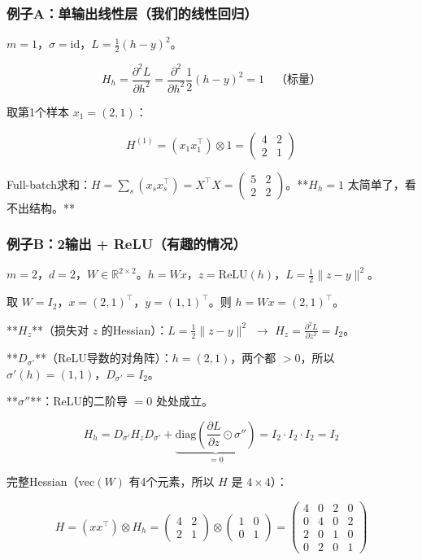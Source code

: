 \documentclass[12pt,a4paper]{article}
\begin{document}
\subsubsection{例子A：单输出线性层（我们的线性回归）}

$m = 1$，$\sigma = \text{id}$，$L = \frac{1}{2}(h - y)^2$。


\[H_h = \frac{\partial^2 L}{\partial h^2} = \frac{\partial^2}{\partial h^2}\frac{1}{2}(h-y)^2 = 1 \quad \text{（标量）}\]

取第1个样本 $x_1 = (2, 1)$：


\[H^{(1)} = (x_1 x_1^\top) \otimes 1 = \begin{pmatrix}4&2\\2&1\end{pmatrix}\]

Full-batch求和：$H = \sum_s (x_s x_s^\top) = X^\top X = \begin{pmatrix}5&2\\2&2\end{pmatrix}$。**$H_h = 1$ 太简单了，看不出结构。**


\subsubsection{例子B：2输出 + ReLU（有趣的情况）}

$m = 2$，$d = 2$，$W \in \mathbb{R}^{2 \times 2}$。$h = Wx$，$z = \text{ReLU}(h)$，$L = \frac{1}{2}\|z - y\|^2$。

取 $W = I_2$，$x = (2, 1)^\top$，$y = (1, 1)^\top$。则 $h = Wx = (2, 1)^\top$。

**$H_z$**（损失对 $z$ 的Hessian）：$L = \frac{1}{2}\|z-y\|^2$ $\to$ $H_z = \frac{\partial^2 L}{\partial z^2} = I_2$。

**$D_{\sigma'}$**（ReLU导数的对角阵）：$h = (2, 1)$，两个都 $> 0$，所以 $\sigma'(h) = (1, 1)$，$D_{\sigma'} = I_2$。

**$\sigma''$**：ReLU的二阶导 $= 0$ 处处成立。


\[H_h = D_{\sigma'} H_z D_{\sigma'} + \underbrace{\text{diag}(\frac{\partial L}{\partial z} \odot \sigma'')}_{= 0} = I_2 \cdot I_2 \cdot I_2 = I_2\]

完整Hessian（$\text{vec}(W)$ 有4个元素，所以 $H$ 是 $4 \times 4$）：


\[H = (xx^\top) \otimes H_h = \begin{pmatrix}4&2\\2&1\end{pmatrix} \otimes \begin{pmatrix}1&0\\0&1\end{pmatrix} = \begin{pmatrix}4&0&2&0\\0&4&0&2\\2&0&1&0\\0&2&0&1\end{pmatrix}\]
\end{document}
